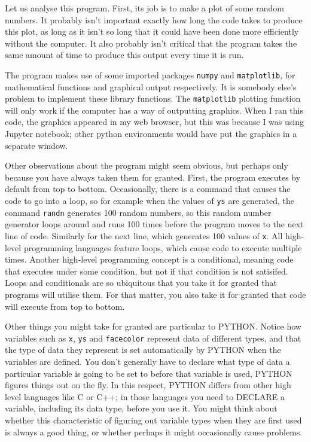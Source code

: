 \documentclass[../physical_computing.tex]{subfiles}
\begin{document}
Let us analyse this program. First, its job is to make a plot of some random numbers. It probably isn't important exactly how long the code takes to produce this plot, as long as it isn't so long that it could have been done more efficiently without the computer. It also probably isn't critical that the program takes the same amount of time to produce this output every time it is run. 

The program makes use of some imported packages \texttt{numpy} and \texttt{matplotlib}, for mathematical functions and graphical output respectively.
It is somebody else's problem to implement these library functions. The \texttt{matplotlib} plotting function will only work if the computer has a way of outputting graphics. When I ran this code, the graphics appeared in my web browser, but this was because I was using Jupyter notebook; other python environments would have put the graphics in a separate window. 

Other observations about the program might seem obvious, but perhaps only because you have always taken them for granted. First, the program executes by default from top to bottom. Occasionally, there is a command that causes the code to go into a loop, so for example when the values of \texttt{ys} are generated, the
command \texttt{randn} generates 100 random numbers, so this random number 
generator loops around and runs 100 times before the program moves to the next
line of code. Similarly for the next line, which generates 100 values of \texttt{x}. All high-level programming languages feature loops, which cause code to execute multiple times. Another high-level programming concept is a conditional, meaning code that executes under some condition, but not if that condition is not satisifed. Loops and conditionals are so ubiquitous that you take it for granted that programs will utilise them. For that matter, you also take it for granted that code will execute from top to bottom.

Other things you might take for granted are particular to PYTHON. Notice how variables such as \texttt{x}, \texttt{ys} and \texttt{facecolor} represent data of different types, and that the type of data they represent is set automatically by PYTHON when the variables are defined. You don't generally have to declare what type of data a particular variable is going to be set to before that variable is used, PYTHON figures things out on the fly. In this respect, PYTHON differs from other high level languages like C or C++; in those languages you need to DECLARE a variable, including its data type, before you use it. You might think about whether this characteristic of figuring out variable types when they are first used is always a good thing, or whether perhaps it might occasionally cause problems.
\end{document}
